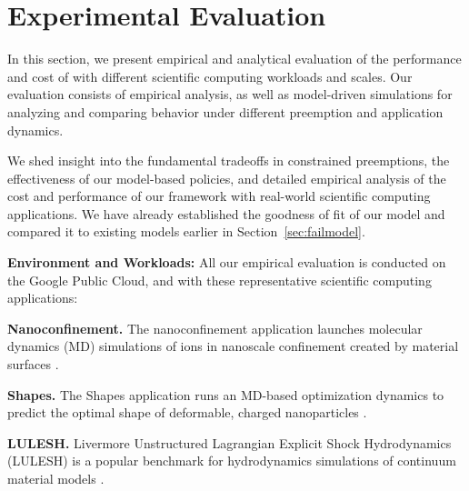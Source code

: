 \vspace*{\subsecspace}
\section{Experimental Evaluation}
\label{sec:eval}

In this section, we present empirical and analytical evaluation of the performance and cost of \sysname with different scientific computing workloads and scales. 
Our evaluation consists of empirical analysis, as well as model-driven simulations for analyzing and comparing \sysname behavior under different preemption and application dynamics.

We shed insight into the fundamental tradeoffs in constrained preemptions, the effectiveness of our model-based policies, and detailed empirical analysis of the cost and performance of our \sysname framework with real-world scientific computing applications. 
We have already established the goodness of fit of our model and compared it to existing models earlier in Section~\ref{sec:failmodel}. 


\noindent \textbf{Environment and Workloads:} All our empirical evaluation is conducted on the Google Public Cloud, and with these representative scientific computing applications: 

\noindent \textbf{Nanoconfinement.}
The nanoconfinement application launches molecular dynamics (MD) simulations of ions in nanoscale confinement created by material surfaces \cite{jyto,kadupitiya2017}.

\noindent \textbf{Shapes.} The Shapes application runs an MD-based optimization dynamics to predict the optimal shape of deformable, charged nanoparticles \cite{jto1,jjzo1}. 

\noindent \textbf{LULESH.} Livermore Unstructured Lagrangian Explicit Shock Hydrodynamics (LULESH)  is a popular benchmark for hydrodynamics simulations of continuum material models \cite{IPDPS13:LULESH,LULESH2:changes}. 


